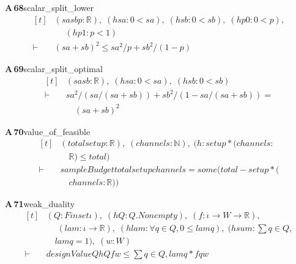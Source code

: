 \documentclass[conference]{IEEEtran}
\theoremstyle{definition}
\newcommand{\lean}[1]{\textsf{\footnotesize #1}}
\begin{document}
\noindent\textbf{A\,68}\quad\lean{scalar\_split\_lower}
{\footnotesize\[ \begin{aligned}[t]
&(\mathit{sa} \mathit{sb} \mathit{p} : \mathbb{R} ),\; (\mathit{hsa} : 0 < \mathit{sa}),\; (\mathit{hsb} : 0 < \mathit{sb}),\; (\mathit{hp0} : 0 < \mathit{p}),\\
&\quad \; (\mathit{hp1} : \mathit{p} < 1)\\
\vdash\;&(\mathit{sa} + \mathit{sb}) ^{2} \leq \mathit{sa} ^{2} / \mathit{p} + \mathit{sb} ^{2} / (1 - \mathit{p})
\end{aligned} \]}

\noindent\textbf{A\,69}\quad\lean{scalar\_split\_optimal}
{\footnotesize\[ \begin{aligned}[t]
&(\mathit{sa} \mathit{sb} : \mathbb{R} ),\; (\mathit{hsa} : 0 < \mathit{sa}),\; (\mathit{hsb} : 0 < \mathit{sb})\\
\vdash\;&\mathit{sa} ^{2} / (\mathit{sa} / (\mathit{sa} + \mathit{sb})) + \mathit{sb} ^{2} / (1 - \mathit{sa} / (\mathit{sa} + \mathit{sb})) =\\
&\quad (\mathit{sa} + \mathit{sb}) ^{2}
\end{aligned} \]}

\noindent\textbf{A\,70}\quad\lean{value\_of\_feasible}
{\footnotesize\[ \begin{aligned}[t]
&(\mathit{total} \mathit{setup} : \mathbb{R} ),\; (\mathit{channels} : \mathbb{N} ),\; (\mathit{h} : \mathit{setup} * (\mathit{channels} :\\
&\quad \mathbb{R} ) \leq \mathit{total})\\
\vdash\;&\mathit{sampleBudget} \mathit{total} \mathit{setup} \mathit{channels} = \mathit{some} (\mathit{total} - \mathit{setup} * (\\
&\quad \mathit{channels} : \mathbb{R} ))
\end{aligned} \]}

\noindent\textbf{A\,71}\quad\lean{weak\_duality}
{\footnotesize\[ \begin{aligned}[t]
&(\mathit{Q} : \mathit{Finset} \iota ),\; (\mathit{hQ} : \mathit{Q}.\mathit{Nonempty}),\; (\mathit{f} : \iota \to \mathit{W} \to \mathbb{R} ),\\
&\quad \; (\mathit{lam} : \iota \to \mathbb{R} ),\; (\mathit{hlam} : \forall \mathit{q} \in \mathit{Q}, 0 \leq \mathit{lam} \mathit{q}),\; (\mathit{hsum} : \textstyle\sum \mathit{q} \in \mathit{Q},\\
&\quad \mathit{lam} \mathit{q} = 1),\; (\mathit{w} : \mathit{W})\\
\vdash\;&\mathit{designValue} \mathit{Q} \mathit{hQ} \mathit{f} \mathit{w} \leq \textstyle\sum \mathit{q} \in \mathit{Q}, \mathit{lam} \mathit{q} * \mathit{f} \mathit{q} \mathit{w}
\end{aligned} \]}
\end{document}
